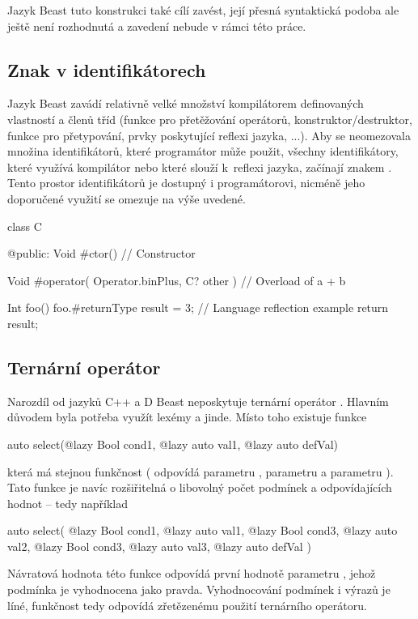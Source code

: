 Jazyk Beast tuto konstrukci také cílí zavést, její přesná syntaktická podoba ale ještě není rozhodnutá a zavedení nebude v rámci této práce.

\subsection{Znak \inlineCode{\#} v identifikátorech}
Jazyk Beast zavádí relativně velké množství kompilátorem definovaných vlastností a členů tříd (funkce pro přetěžování operátorů, konstruktor/destruktor, funkce pro přetypování, prvky poskytující reflexi jazyka, ...). Aby se neomezovala množina identifikátorů, které programátor může použit, všechny identifikátory, které využívá kompilátor nebo které slouží k~reflexi jazyka, začínají znakem \inlineCode{\#}. Tento prostor identifikátorů je dostupný i programátorovi, nicméně jeho doporučené využití se omezuje na výše uvedené.

\begin{code}
class C {

@public:
	Void #ctor() {
		// Constructor	
	}

	Void #operator( Operator.binPlus, C? other ) {
		// Overload of a + b
	}

	Int foo() {
		foo.#returnType	result = 3; // Language reflection example
		return result;
	}
	
}
\end{code}

\subsection{Ternární operátor} \label{ternary}
Narozdíl od jazyků C++ a D Beast neposkytuje ternární operátor . Hlavním důvodem byla potřeba využít lexémy  a \inlineDCode{:} jinde. Místo toho existuje funkce 

\begin{code}
auto select(@lazy Bool cond1, @lazy auto val1, @lazy auto defVal)
\end{code}
která má stejnou funkčnost ( odpovídá parametru ,  parametru  a  parametru ). Tato funkce je navíc rozšiřitelná o libovolný počet podmínek a odpovídajících hodnot -- tedy například 

\begin{code}
auto select(
	@lazy Bool cond1, @lazy auto val1,
	@lazy Bool cond3, @lazy auto val2,
	@lazy Bool cond3, @lazy auto val3,
	@lazy auto defVal
	)
\end{code}
Návratová hodnota této funkce odpovídá první hodnotě parametru , jehož podmínka  je vyhodnocena jako pravda. Vyhodnocování podmínek i výrazů je líné, funkčnost tedy odpovídá zřetězenému použití ternárního operátoru.


